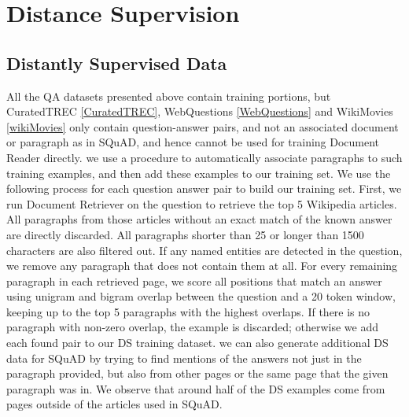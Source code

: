   \section{Distance Supervision}
\subsection{Distantly Supervised Data}
All the QA datasets presented above contain training portions, but CuratedTREC \ref{CuratedTREC}, WebQuestions \ref{WebQuestions} and WikiMovies \ref{wikiMovies} only contain question-answer pairs, and not an associated document or paragraph as in SQuAD, and hence cannot be used for training Document Reader directly.
we use a procedure to automatically associate paragraphs to such training examples, and then add these examples to our training set. We use the following process for each question answer pair to build our training set. First, we run Document Retriever on the question to retrieve the top 5 Wikipedia articles. All paragraphs from those articles without an exact match of the known answer are directly discarded. All paragraphs shorter than 25 or longer than 1500 characters are also filtered out. If any named entities are detected in the question, we remove any paragraph that does not contain them at all. For every remaining paragraph in each retrieved page, we score all positions that match an answer using unigram and bigram overlap between the question and a 20 token window, keeping up to the top 5 paragraphs with the highest overlaps. If there is no paragraph with non-zero overlap, the example is discarded; otherwise we add each found pair to our DS training dataset.
we can also generate additional DS data for SQuAD by trying to find mentions of the answers not just in the paragraph provided, but also from other pages or the same page that the given paragraph was in. We observe that around half of the DS examples come from pages outside of the articles used in SQuAD\cite{P17-1171}.
